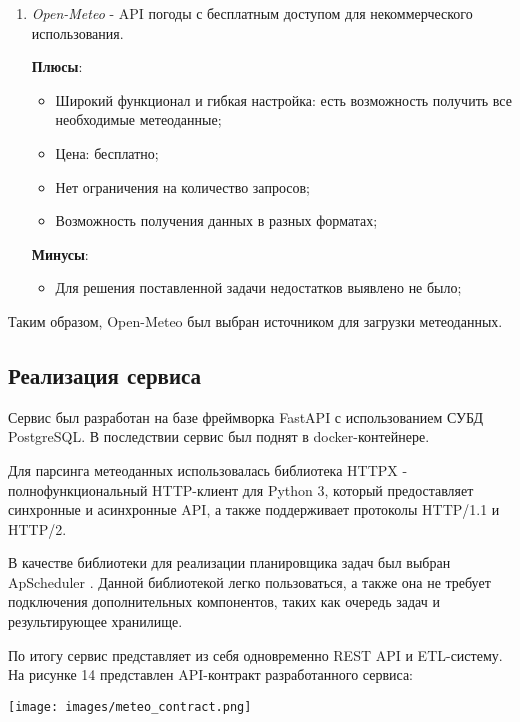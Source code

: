 \begin{enumerate}
        \item \textit{Open-Meteo} \cite{open_meteo} -  API погоды с бесплатным доступом для некоммерческого использования.
        
        \textbf{Плюсы}:  
        \begin{itemize}
                \item Широкий функционал и гибкая настройка: есть возможность получить все необходимые метеоданные;
                \item Цена: бесплатно;
                \item Нет ограничения на количество запросов; 
                \item Возможность получения данных в разных форматах; 
        \end{itemize}
        
        \textbf{Минусы}:
        \begin{itemize}
                \item Для решения поставленной задачи недостатков выявлено не было;
        \end{itemize}
        
    \end{enumerate}

    Таким образом, Open-Meteo был выбран источником для загрузки метеоданных.

    \subsection{Реализация сервиса}
        Сервис был разработан на базе фреймворка FastAPI с использованием СУБД PostgreSQL. В последствии сервис был поднят в docker-контейнере. 
        
        Для парсинга метеоданных использовалась библиотека HTTPX \cite{HTTPX} - полнофункциональный HTTP-клиент для Python 3, который предоставляет синхронные и асинхронные API, а также поддерживает протоколы HTTP/1.1 и HTTP/2.

        В качестве библиотеки для реализации планировщика задач был выбран ApScheduler \cite{apscheduler}. Данной библиотекой легко пользоваться, а также она не требует подключения дополнительных компонентов, таких как очередь задач и результирующее хранилище.

        По итогу сервис представляет из себя одновременно REST API и ETL-систему.
        На рисунке 14 представлен API-контракт разработанного сервиса:
        \noindent\begin{minipage}[t]{\textwidth}
                 \begin{center}
                 \texttt{[image: images/meteo\_contract.png]}
                 \end{center} \label{fig:Moreno}
            
            \end{minipage}
            
